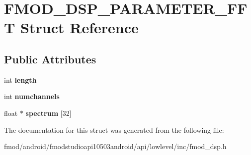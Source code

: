 \hypertarget{struct_f_m_o_d___d_s_p___p_a_r_a_m_e_t_e_r___f_f_t}{\section{F\+M\+O\+D\+\_\+\+D\+S\+P\+\_\+\+P\+A\+R\+A\+M\+E\+T\+E\+R\+\_\+\+F\+F\+T Struct Reference}
\label{struct_f_m_o_d___d_s_p___p_a_r_a_m_e_t_e_r___f_f_t}
}
\subsection*{Public Attributes}
\begin{DoxyCompactItemize}
\item 
\hypertarget{struct_f_m_o_d___d_s_p___p_a_r_a_m_e_t_e_r___f_f_t_a5b0dd45191397a692db5e22211815877}{int {\bfseries length}}\label{struct_f_m_o_d___d_s_p___p_a_r_a_m_e_t_e_r___f_f_t_a5b0dd45191397a692db5e22211815877}

\item 
\hypertarget{struct_f_m_o_d___d_s_p___p_a_r_a_m_e_t_e_r___f_f_t_a749a495bbaff014d052ad7f9bf2317e5}{int {\bfseries numchannels}}\label{struct_f_m_o_d___d_s_p___p_a_r_a_m_e_t_e_r___f_f_t_a749a495bbaff014d052ad7f9bf2317e5}

\item 
\hypertarget{struct_f_m_o_d___d_s_p___p_a_r_a_m_e_t_e_r___f_f_t_aee2ddc15a89cf0ed73654cd5c607aa12}{float $\ast$ {\bfseries spectrum} \mbox{[}32\mbox{]}}\label{struct_f_m_o_d___d_s_p___p_a_r_a_m_e_t_e_r___f_f_t_aee2ddc15a89cf0ed73654cd5c607aa12}

\end{DoxyCompactItemize}


The documentation for this struct was generated from the following file\+:\begin{DoxyCompactItemize}
\item 
fmod/android/fmodstudioapi10503android/api/lowlevel/inc/fmod\+\_\+dsp.\+h\end{DoxyCompactItemize}
